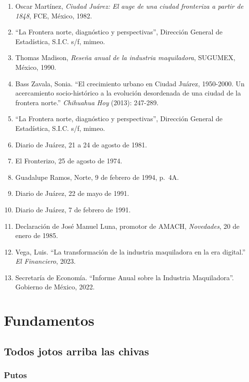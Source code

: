 \documentclass[
  letterpaper,
]{book}
\providecommand{\tightlist}{%
  \setlength{\itemsep}{0pt}\setlength{\parskip}{0pt}}\usepackage{longtable,booktabs,array}
\begin{document}
\begin{enumerate}
\def\labelenumi{\arabic{enumi}.}
\tightlist
\item
  Oscar Martínez, \emph{Ciudad Juárez: El auge de una ciudad fronteriza
  a partir de 1848}, FCE, México, 1982.
\item
  ``La Frontera norte, diagnóstico y perspectivas'', Dirección General
  de Estadística, S.I.C. s/f, mimeo.
\item
  Thomas Madison, \emph{Reseña anual de la industria maquiladora},
  SUGUMEX, México, 1990.
\item
  Bass Zavala, Sonia. ``El crecimiento urbano en Ciudad Juárez,
  1950-2000. Un acercamiento socio-histórico a la evolución desordenada
  de una ciudad de la frontera norte.'' \emph{Chihuahua Hoy} (2013):
  247-289.
\item
  ``La Frontera norte, diagnóstico y perspectivas'', Dirección General
  de Estadística, S.I.C. s/f, mimeo.
\item
  Diario de Juárez, 21 a 24 de agosto de 1981.
\item
  El Fronterizo, 25 de agosto de 1974.
\item
  Guadalupe Ramos, Norte, 9 de febrero de 1994, p.~4A.
\item
  Diario de Juárez, 22 de mayo de 1991.
\item
  Diario de Juárez, 7 de febrero de 1991.
\item
  Declaración de José Manuel Luna, promotor de AMACH, \emph{Novedades},
  20 de enero de 1985.
\item
  Vega, Luis. ``La transformación de la industria maquiladora en la era
  digital.'' \emph{El Financiero}, 2023.
\item
  Secretaría de Economía. ``Informe Anual sobre la Industria
  Maquiladora''. Gobierno de México, 2022.
\end{enumerate}


\chapter{Fundamentos}\label{fundamentos}

\section{Todos jotos arriba las
chivas}\label{todos-jotos-arriba-las-chivas}

\subsection{Putos}\label{putos}
\end{document}
